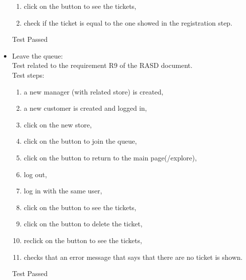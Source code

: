 \begin{itemize}
\begin{enumerate}
        \item click on the button to see the tickets,

        \item check if the ticket is equal to the one showed in the registration step.
    \end{enumerate}
    Test Passed

    \item Leave the queue: \\
    Test related to the requirement R9 of the RASD document. \\
    Test steps:\\
    \begin{enumerate}
        \item a new manager (with related store) is created,

        \item a new customer is created and logged in,

        \item click on the new store,

        \item click on the button to join the queue,

        \item click on the button to return to the main page(/explore),

        \item log out,

        \item log in with the same user,

        \item click on the button to see the tickets,

        \item click on the button to delete the ticket,

        \item reclick on the button to see the tickets,

        \item checks that an error message that says that there are no ticket is shown.
    \end{enumerate}
    Test Passed


\end{itemize}
